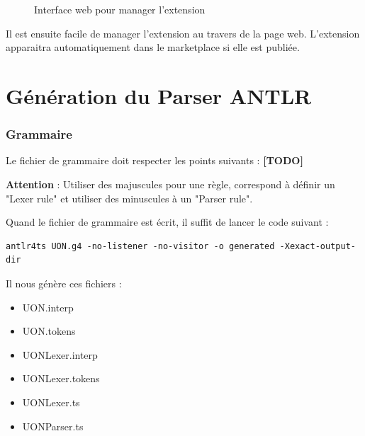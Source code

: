\documentclass[
    iict, %
    il, %
]{heig-tb}
\begin{document}
\begin{figure}[!h]
    \begin{center}
    \end{center}
    \caption[Interface web pour manager l'extension]{\label{manage-publisher} Interface web pour manager l'extension}
\end{figure}

Il est ensuite facile de manager l'extension au travers de la page web.
L'extension apparaitra automatiquement dans le marketplace si elle est publiée.


\section{Génération du Parser ANTLR}
\subsubsection{Grammaire}
Le fichier de grammaire doit respecter les points suivants : \textbf{[TODO]}

\textbf{Attention} : Utiliser des majuscules pour une règle, correspond à définir un "Lexer rule" et utiliser des minuscules à un  "Parser rule".

Quand le fichier de grammaire est écrit, il suffit de lancer le code suivant :

\begin{lstlisting}[frame=single]
    antlr4ts UON.g4 -no-listener -no-visitor -o generated -Xexact-output-dir
\end{lstlisting}

Il nous génère ces fichiers :
\begin{itemize}
    \item UON.interp
    \item UON.tokens
    \item UONLexer.interp
    \item UONLexer.tokens
    \item UONLexer.ts
    \item UONParser.ts
\end{itemize}
\end{document}
